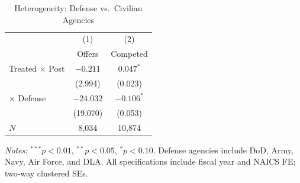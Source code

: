 \begin{table}[H]
\centering
\caption{Heterogeneity: Defense vs.\ Civilian Agencies}
\label{tab:het}
\begin{threeparttable}
\begin{tabular}{lcc}
\toprule
 & (1) & (2) \\
 & Offers & Competed \\
\midrule
Treated $\times$ Post & $-0.211$ & $0.047^{*}$ \\
 & (2.994) & (0.023) \\
$\times$ Defense & $-24.032$ & $-0.106^{*}$ \\
 & (19.070) & (0.053) \\
$N$ & 8,034 & 10,874 \\
\bottomrule
\end{tabular}
\begin{tablenotes}[flushleft]
\small
\item \textit{Notes:} $^{***}p<0.01$, $^{**}p<0.05$, $^{*}p<0.10$. Defense agencies include DoD, Army, Navy, Air Force, and DLA. All specifications include fiscal year and NAICS FE; two-way clustered SEs.
\end{tablenotes}
\end{threeparttable}
\end{table}
